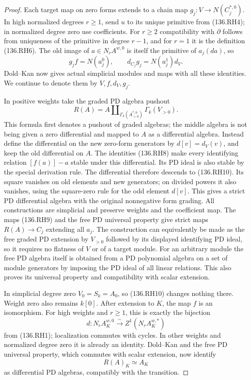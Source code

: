 \begin{proof}
Each target map on zero forms extends to a chain map
$g_j:V\to N(C_j^{*,0})$. In high normalized degrees $r\ge1$,
send $u$ to its unique primitive from (136.RH4); in normalized
degree zero use coefficients. For $r\ge2$ compatibility with
$\partial$ follows from uniqueness of the primitive in degree
$r-1$, and for $r=1$ it is the definition (136.RH6).
The old image of $a\in N_rA^{w,0}$ is itself the primitive
of $a_j(da)$, so
\[
                 g_j f=N(a_j^0),\qquad
                   d_{C_j}g_j=N(a_j^1)d_V.                \tag{136.RH9}
\]
Dold--Kan now gives actual simplicial modules and maps with
all these identities. We continue to denote them by $V,f,d_V,g_j$.

In positive weights take the graded PD algebra pushout
\[
 R(A)=A\amalg_{\Gamma_k(A^{*,0}_{>0})}
                              \Gamma_k(V_{>0}).           \tag{136.RH10}
\]
This formula first denotes a pushout of graded algebras;
the middle algebra is not being given a zero differential
and mapped to $A$ as a differential algebra. Instead define
the differential on the new zero-form generators by
$d[v]=d_V(v)$, and keep the old differential on $A$.
The identities (136.RH8) make every identifying relation
$[f(a)]-a$ stable under this differential. Its PD ideal is
also stable by the special derivation rule. The differential
therefore descends to (136.RH10). Its square vanishes on
old elements and new generators; on divided powers it also
vanishes, using the square-zero rule for the odd element
$d[v]$. This gives a strict PD differential algebra with
the original nonnegative form grading. All constructions
are simplicial and preserve weights and the coefficient map.
The maps (136.RH9) and the free PD universal property give
strict maps $R(A)\to C_j$ extending all $a_j$.
The construction can equivalently be made as the free graded
PD extension by $V_{>0}$ followed by its displayed identifying
PD ideal, so it requires no flatness of $V$ or of a target module.
For an arbitrary module the free PD algebra itself is obtained
from a PD polynomial algebra on a set of module generators by
imposing the PD ideal of all linear relations. This also proves
its universal property and compatibility with scalar extension.

In simplicial degree zero $V_0=S_k=A_0$, so (136.RH10)
changes nothing there. Weight zero also remains $k[0]$.
After extension to $K$, the map $f$ is an isomorphism.
For high weights and $r\ge1$, this is exactly the bijection
\[
 d:N_rA_K^{w,0}\xrightarrow{\sim} Z^1(N_rA_K^{w,*})
\]
from (136.RH1); localization commutes with cycles.
In other weights and normalized degree zero it is already
an identity. Dold--Kan and the free PD universal property,
which commutes with scalar extension, now identify
\[
                           R(A)_K\simeq A_K               \tag{136.RH11}
\]
as differential PD algebras, compatibly with the transition.


\end{proof}
